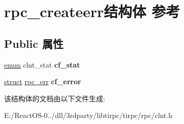 \hypertarget{structrpc__createerr}{}\section{rpc\+\_\+createerr结构体 参考}
\label{structrpc__createerr}
\subsection*{Public 属性}
\begin{DoxyCompactItemize}
\item 
\mbox{\label{structrpc__createerr_a7d9a53ae5071f743a5438d6745ff423f}} 
\hyperlink{interfaceenum}{enum} clnt\+\_\+stat {\bfseries cf\+\_\+stat}
\item 
\mbox{\label{structrpc__createerr_a1409f1f90c13b465452ea80a53bb4e92}} 
\hyperlink{interfacestruct}{struct} \hyperlink{structrpc__err}{rpc\+\_\+err} {\bfseries cf\+\_\+error}
\end{DoxyCompactItemize}


该结构体的文档由以下文件生成\+:\begin{DoxyCompactItemize}
\item 
E\+:/\+React\+O\+S-\/0../dll/3rdparty/libtirpc/tirpc/rpc/clnt.\+h\end{DoxyCompactItemize}
